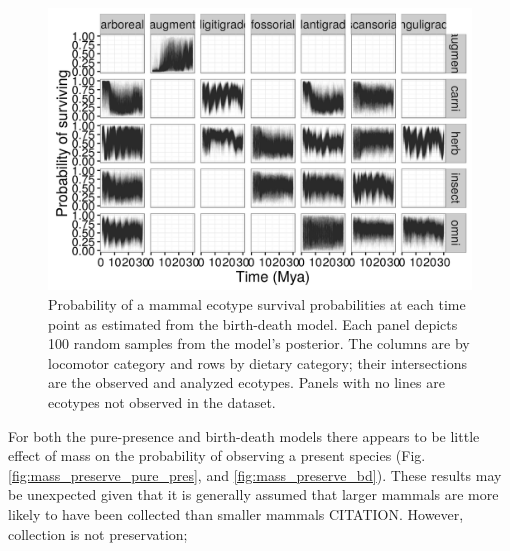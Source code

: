 \documentclass[12pt,letterpaper]{article}
\begin{document}
\begin{figure}[ht]
  \centering
  \includegraphics[width=\textwidth,height=0.8\textheight,keepaspectratio=true]{figure/ecotype_survival_bd}
  \caption[Ecotype survival probability estimated from the birth-death model]{Probability of a mammal ecotype survival probabilities at each time point as estimated from the birth-death model. Each panel depicts 100 random samples from the model's posterior. The columns are by locomotor category and rows by dietary category; their intersections are the observed and analyzed ecotypes. Panels with no lines are ecotypes not observed in the dataset.}
  \label{fig:eco_survival}
\end{figure}


For both the pure-presence and birth-death models there appears to be little effect of mass on the probability of observing a present species (Fig. \ref{fig:mass_preserve_pure_pres}, and \ref{fig:mass_preserve_bd}). These results may be unexpected given that it is generally assumed that larger mammals are more likely to have been collected than smaller mammals CITATION. However, collection is not preservation; 
\end{document}

